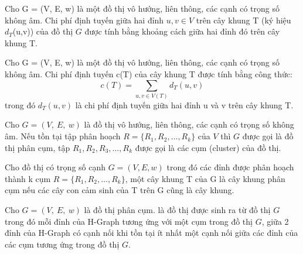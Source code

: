 \begin{definition}
Cho G = (V, E, w) là một đồ thị vô hướng, liên thông, các cạnh có trọng số không âm. Chi phí định tuyến giữa hai đỉnh $u, v \in V$ trên cây khung T (ký hiệu $d_T$(u,v)) của đồ thị $G$ được tính bằng khoảng cách giữa hai đỉnh đó trên cây khung T.
\end{definition}

\begin{definition}
Cho G = (V, E, w) là một đồ thị vô hướng, liên thông, các cạnh có trọng số không âm. Chi phí định tuyến c(T) của cây khung T được tính bằng công thức:
\[
	c(T)= \sum_{u,v \in V(T)} d_T(u,v)
\]
 trong đó $d_T(u,v)$ là chi phí định tuyến giữa hai đỉnh u và v trên cây khung T.
\end{definition}

\begin{definition}
Cho $G = (V,~E,~w)$ là đồ thị vô hướng, liên thông, các cạnh có trọng số không âm. Nếu tồn tại tập phân hoạch $R=\{R_1, R_2,\ldots,R_k\}$ của $V$ thì $G$ được gọi là đồ thị phân cụm, tập $R_1, R_2, R_3,\ldots,R_k$ được gọi là các cụm (cluster) của đồ thị.
\end{definition}	
	
\begin{definition}
Cho đồ thị có trọng số cạnh $G = (V, E, w)$ trong đó các đỉnh được phân hoạch thành k cụm $R=\{R_1, R_2, \ldots,R_k\}$, một cây khung T của G là cây khung phân cụm nếu các cây con cảm sinh của T trên G cũng là cây khung.
\end{definition}


\begin{definition}[H-Graph]
	Cho $G = (V,~E,~w)$ là đồ thị phân cụm.  là đồ thị được sinh ra từ đồ thị $G$ trong đó mỗi đỉnh của H-Graph tương ứng với một cụm trong đồ thị $G$, giữa 2 đỉnh của H-Graph có cạnh nối khi tồn tại ít nhất một cạnh nối giữa các đỉnh của các cụm tương ứng trong đồ thị $G$.
\end{definition}


